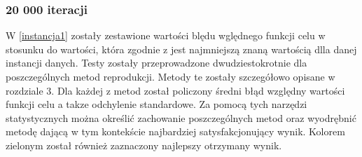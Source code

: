 \subsubsection{20 000 iteracji}
\par
 W \ref{instancja1} zostały zestawione wartości blędu wględnego funkcji celu w stosunku do wartości, która zgodnie z \cite{qaplib} jest najmniejszą znaną wartością dlla danej instancji danych. Testy zostały przeprowadzone dwudziestokrotnie dla poszczególnych metod reprodukcji. Metody te zostały szczegółowo opisane w rozdziale 3. Dla każdej z metod został policzony średni błąd względny wartości funkcji celu a takze odchylenie standardowe. Za pomocą tych narzędzi statystycznych można określić zachowanie poszczególnych metod oraz wyodrębnić metodę dającą w tym kontekście najbardziej satysfakcjonujący wynik. Kolorem zielonym został również zaznaczony najlepszy otrzymany wynik.\\
\par
